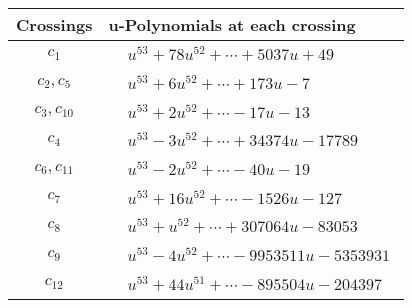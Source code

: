 \documentclass[1p]{elsarticle_modified}
\theoremstyle{definition}
\begin{document}
\begin{tabular}{m{50pt}|m{274pt}}
Crossings & \hspace{64pt}u-Polynomials at each crossing \\
\hline $$\begin{aligned}c_{1}\end{aligned}$$&$\begin{aligned}
&u^{53}+78 u^{52}+\cdots+5037 u+49
\end{aligned}$\\
\hline $$\begin{aligned}c_{2},c_{5}\end{aligned}$$&$\begin{aligned}
&u^{53}+6 u^{52}+\cdots+173 u-7
\end{aligned}$\\
\hline $$\begin{aligned}c_{3},c_{10}\end{aligned}$$&$\begin{aligned}
&u^{53}+2 u^{52}+\cdots-17 u-13
\end{aligned}$\\
\hline $$\begin{aligned}c_{4}\end{aligned}$$&$\begin{aligned}
&u^{53}-3 u^{52}+\cdots+34374 u-17789
\end{aligned}$\\
\hline $$\begin{aligned}c_{6},c_{11}\end{aligned}$$&$\begin{aligned}
&u^{53}-2 u^{52}+\cdots-40 u-19
\end{aligned}$\\
\hline $$\begin{aligned}c_{7}\end{aligned}$$&$\begin{aligned}
&u^{53}+16 u^{52}+\cdots-1526 u-127
\end{aligned}$\\
\hline $$\begin{aligned}c_{8}\end{aligned}$$&$\begin{aligned}
&u^{53}+u^{52}+\cdots+307064 u-83053
\end{aligned}$\\
\hline $$\begin{aligned}c_{9}\end{aligned}$$&$\begin{aligned}
&u^{53}-4 u^{52}+\cdots-9953511 u-5353931
\end{aligned}$\\
\hline $$\begin{aligned}c_{12}\end{aligned}$$&$\begin{aligned}
&u^{53}+44 u^{51}+\cdots-895504 u-204397
\end{aligned}$\\
\hline
\end{tabular}\\~\\
\end{document}
